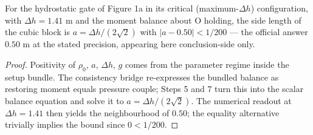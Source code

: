 \begin{theorem}
\label{thm:IPhO2026Problems_problem_IPhO_2026_1_A_1:hydrostatic_gate_side_length_a_target}
For the hydrostatic gate of Figure 1a in its critical (maximum-$\Delta h$)
configuration, with $\Delta h = 1.41$ m and the moment balance about O
holding, the side length of the cubic block is
$a = \Delta h/(2\sqrt{2})$ with $|a - 0.50| < 1/200$ — the official answer
$0.50$ m at the stated precision, appearing here conclusion-side only.
\end{theorem}
\begin{proof}
Positivity of $\rho_0$, $a$, $\Delta h$, $g$ comes from the parameter regime
inside the setup bundle. The consistency bridge re-expresses the bundled
balance as restoring moment equals pressure couple; Steps 5 and 7 turn this
into the scalar balance equation and solve it to $a = \Delta h/(2\sqrt{2})$.
The numerical readout at $\Delta h = 1.41$ then yields the neighbourhood of
$0.50$; the equality alternative trivially implies the bound since
$0 < 1/200$.
\end{proof}

